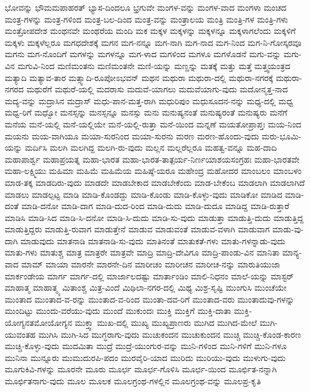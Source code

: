 {ಭೋವನ್ನು
ಭೌಮಮಪಾಹರತ್
ಭ್ಯಾಸ-ದಿಂದಲೂ
ಭ್ರಗುವೇ
ಮಂಗಳ-ವನ್ನು
ಮಂಗಳ-ವಾದ
ಮಂಗಳಾ
ಮಂಚದ
ಮಂತ್ರ-ಗಳನ್ನು
ಮಂತ್ರ-ಗಳಿಂದ
ಮಂತ್ರ-ಬಲ-ದಿಂದ
ಮಂತ್ರ-ವನ್ನು
ಮಂತ್ರಾಲಯ
ಮಂತ್ರಿ
ಮಂತ್ರಿ-ಗಳ
ಮಂತ್ರಿ-ಗಳು
ಮಂತ್ರೋಪದೇಶ
ಮಂಥನವೇ
ಮಂಥರೆಯ
ಮಂದಿ
ಮಕ
ಮಕ್ಕಳ
ಮಕ್ಕಳನ್ನು
ಮಕ್ಕಳನ್ನೂ
ಮಕ್ಕಳಾಗಲೆಂದು
ಮಕ್ಕಳಿಗೆ
ಮಕ್ಕಳು
ಮಕ್ಕಳೆಲ್ಲರೂ
ಮಗಧದೇಶಕ್ಕೆ
ಮಗನ
ಮಗ-ನನ್ನೂ
ಮಗ-ನಾಗಿ
ಮಗ-ನಾದ
ಮಗ-ನಿಂದ
ಮಗ-ನಿ-ಗೋಸ್ಕರವೂ
ಮಗನು
ಮಗ-ನೊಂದಿಗೆ
ಮಗಳನ್ನು
ಮಗಳನ್ನೂ
ಮಗ-ಳಾದ
ಮಗಳಿಂದ
ಮಗಳೂ
ಮಗಳೊಡನೆ
ಮಗು-ವನ್ನು
ಮಗು-ವಿನ
ಮಗುವಿ-ನಿಂದ
ಮಣಿಮಂತನು
ಮಣಿಮಂತನೇ
ಮಣಿ-ಯನ್ನು
ಮಣ್ಣನ್ನು
ಮತಕ್ಕೆ
ಮತ್ತು
ಮತ್ತೆ
ಮತ್ತ್ವಯಂತ್ರದ
ಮತ್ಯಾದಿ
ಮತ್ಯಾವ-ತಾರ
ಮತ್ಸ್ಯಾದಿ-ರೂಪೋಽಭವನ್
ಮಥನ
ಮಥುರಾ
ಮಥುರಾ-ದಲ್ಲಿ
ಮಥುರಾ-ನಗರಕ್ಕೆ
ಮಥುರಾ-ನಗರದ
ಮಥುರೆಗೆ
ಮಥುರೆ-ಯಲ್ಲಿ
ಮದರಾಸು
ಮದುವೆ-ಯಾಗಲು
ಮದುವೆಯಾಗು-ವುದು
ಮದೋನ್ಮತ್ತ-ನಾದ
ಮದ್ಯ-ವನ್ನು
ಮದ್ರಾಸಿನ
ಮದ್ರಾಸ್
ಮಧು-ಪಾನ-ಮತ್ತ-ರಾಗಿ
ಮಧುರಿಪುಂ
ಮಧುಸೂದನ-ನನ್ನು
ಮಧ್ಯ-ದಲ್ಲಿ
ಮಧ್ವ
ಮಧ್ವ-ರಿಗೆ
ಮಧ್ವೋ
ಮನಸ್ಸನ್ನು
ಮನಸ್ಸನ್ನೂ
ಮನಸ್ಸು
ಮನು
ಮನುಷ್ಯನಂತೆ
ಮನುಷ್ಯರಂತೆ
ಮನುಷ್ಯರು
ಮನೆಗೆ
ಮನೆಯ
ಮನೆ-ಯಲ್ಲಿ
ಮನೆ-ಯಲ್ಲಿಯೇ
ಮನೆ-ಯಲ್ಲಿ-ರುತ್ತಾ
ಮನೆ-ಯಿಂದ
ಮನ್ನಣೆ
ಮಯತೋಪ್ರಾಪ್ತಃ
ಮಯ-ನಿಂದ
ಮಯನು
ಮಯ-ವಾಗಿಯೂ
ಮಯಾ-ಸುರನಿಂದ
ಮಯಾ-ಸುರನು
ಮರಣ
ಮರಣ-ಹೊಂದು-ವುದು
ಮರು-ಭೂಮಿ-ಯನ್ನು
ಮರ್ದಿಸಿ
ಮಲಗಿ
ಮಲಗಿದ್ದ
ಮಲಗಿ-ರು-ವುದು
ಮಲ್ಲನ
ಮಲ್ಲರೆಲ್ಲರೂ
ಮಹತ್ವ-ವನ್ನೂ
ಮಹ-ದಾದಿ
ಮಹಾಪಾರ್ಶ್ವ
ಮಹಾಪ್ರಯತ್ನ
ಮಹಾ-ಭಾರತ
ಮಹಾ-ಭಾರತ-ತಾತ್ಪರ್ಯ-ನಿರ್ಣಯಾಶಯಸಂಗ್ರಹಃ
ಮಹಾ-ಭಾರತವೇ
ಮಹಾ-ಲಕ್ಷ್ಮಿಯು
ಮಹಿಮಾ
ಮಹಿಮೆ
ಮಹಿಮೆಯ
ಮಹಿಷ್ಠೆ-ಯರೂ
ಮಹೇಂದ್ರ
ಮಹೋದರ
ಮಾಂಬಲಂ
ಮಾಂಬಳಂ
ಮಾಡ-ತಕ್ಕ
ಮಾಡದಿರು-ವುದು
ಮಾಡದೇ
ಮಾಡಬೇಕಾದ
ಮಾಡಬೇಕೆಂದು
ಮಾಡ-ಬೇಕೆಂಬ
ಮಾಡಲಾಗಿ
ಮಾಡಲಾಗಿದೆ
ಮಾಡಲು
ಮಾಡಲ್ಪಟ್ಟ
ಮಾಡಿ
ಮಾಡಿ-ಕೊಂಡದ್ದು
ಮಾಡಿ-ಕೊಂಡು
ಮಾಡಿ-ಕೊಳ್ಳು-ವುದು
ಮಾಡಿಕೋ
ಮಾಡಿದ
ಮಾಡಿ-ದಂತೆ
ಮಾಡಿ-ದನೋ
ಮಾಡಿ-ದಾಗ
ಮಾಡಿ-ದುದ-ರಿಂದ
ಮಾಡಿ-ದುದು
ಮಾಡಿ-ದುದೂ
ಮಾಡಿದ್ದ
ಮಾಡಿ-ರುತ್ತಾರೆ
ಮಾಡಿಸಿ
ಮಾಡಿ-ಸಿದ
ಮಾಡಿ-ಸಿ-ದನೋ
ಮಾಡಿ-ಸಿ-ದುದು
ಮಾಡಿ-ಸು-ವುದು
ಮಾಡುತ್ತಾ
ಮಾಡುತ್ತಿ-ದುದು
ಮಾಡುತ್ತಿದ್ದ
ಮಾಡುತ್ತಿದ್ದರು
ಮಾಡುತ್ತಿ-ರುವಾಗ
ಮಾಡುತ್ತೇನೆ
ಮಾಡುವ
ಮಾಡುವಂತೆ
ಮಾಡುವ-ವಳಾಗಿ
ಮಾಡುವಾಗ
ಮಾಡು-ವು-ದಾಗಿ
ಮಾಡುವುದು
ಮಾತನಾಡಿ
ಮಾತನಾಡಿ-ಸು-ವುದು
ಮಾತಿನಂತೆ
ಮಾತುಕತೆ-ಗಳು
ಮಾತು-ಗಳನ್ನಾಡು-ವುದು
ಮಾತು-ಗಳು
ಮಾತುಶ್ಚ
ಮಾತ್ರ
ಮಾತ್ರರೇ
ಮಾತ್ರವೇ
ಮಾದ್ರಿ
ಮಾದ್ರಿ-ದೇವಿಗೂ
ಮಾದ್ರಿ-ಪಾಂಡು-ವಿನ
ಮಾನಿತಾ
ಮಾನ್ಯ-ವಾದ
ಮಾಮ್
ಮಾಯಾ
ಮಾರನೇ
ಮಾರನೇ-ದಿನ
ಮಾರೀಚಂ
ಮಾರೀಚನ
ಮಾರೀಚ-ನನ್ನು
ಮಾರುತಿಯುಜಾ
ಮಾರ್ಕಂಡೇಯ
ಮಾರ್ಗ
ಮಾರ್ಗ-ದಲ್ಲಿ
ಮಾರ್ಜಾಲದಷ್ಟು
ಮಾರ್ತಾಂಡಿಂ
ಮಾಲಿ-ನಿಧನಂ
ಮಾಲೆ-ಯನ್ನು
ಮಾಸ್ಟರ್
ಮಾಹಾತ್ಮ
ಮಾಹಾತ್ಮ್ಯ
ಮಿತಾಂಶ್ಚ
ಮಿತ್ರ-ವಿಂದೆ
ಮಿಥಿಲಾ-ನಗರ-ದಲ್ಲಿ
ಮಿಥ್ಯ
ಮಿಶ್ರ-ಸೃಷ್ಟಿ
ಮುಂಗುಸಿ
ಮುಂಚೆಯೇ
ಮುಂತಾದ
ಮುಂತಾದ-ವ-ರನ್ನು
ಮುಂತಾದ-ವ-ರಿಂದ
ಮುಂತಾ-ದವ-ರಿಗೆ
ಮುಂತಾದ-ವರು
ಮುಂತಾದುವು-ಗಳನ್ನು
ಮುಂದಿಟ್ಟು
ಮುಂದು-ವರೆಯು-ವುದು
ಮುಂದೆ
ಮುಕುಂದಃ
ಮುಕ್ತಿ
ಮುಕ್ತಿಗೆ
ಮುಕ್ತಿ-ದಾತಾ
ಮುಕ್ತಿ-ಯೋಗ್ಯನತಮೋಯೋಗ್ಯನ
ಮುಕ್ತ್ವಾ
ಮುಖ-ದಲ್ಲಿ
ಮುಖ್ಯ
ಮುಖ್ಯಪ್ರಾಣರು
ಮುಗಿದ
ಮುಗಿದ-ಮೇಲೆ
ಮುಗಿ-ಯುವಂತಹ
ಮುಗಿಸಿ
ಮುಗಿ-ಸಿದ
ಮುಗ್ಧರಾಗು-ವುದು
ಮುಚುಕಂದನ
ಮುಚುಕುಂದನ
ಮುಚ್ಚಿ
ಮುಚ್ಚಿ-ಕೊಂಡ-ಕಾರಣ
ಮುಚ್ಚಿ-ಕೊಳ್ಳು-ವುದು
ಮುದಮಿತಾ
ಮುದ್ರೆ
ಮುದ್ರೆ-ಯುಂಗುರ-ವನ್ನು
ಮುನಿ-ಗಳಿಂದ
ಮುನಿ-ಗಳಿಗೆ
ಮುನಿ-ಗಳೂ
ಮುನಿನಾ
ಮುನ್ನೂರು
ಮುಮುದುರಪಿ-ಪದಂ
ಮುರವೈರಿ-ಯಾದ
ಮುರಿದು
ಮುರಿಯು-ವುದು
ಮುಳುಗು-ವುದು
ಮೂಗುಕಿವಿ-ಗಳನ್ನು
ಮೂರನೇ
ಮೂರು
ಮೂರ್ಛ
ಮೂರ್ಛ-ಗೊಳಿಸಿ
ಮೂರ್ಛ-ಯಿಂದ
ಮೂರ್ಛಿತ-ನನ್ನಾಗಿ
ಮೂರ್ಛಿತನಾಗು-ವುದು
ಮೂಲ
ಮೂಲಕ
ಮೂಲಗ್ರಂಥ-ಗಳಲ್ಲಿನ
ಮೂಲಗ್ರಂಥ-ವನ್ನು
ಮೂಲಪ್ರ-ಕೃತಿ
}
